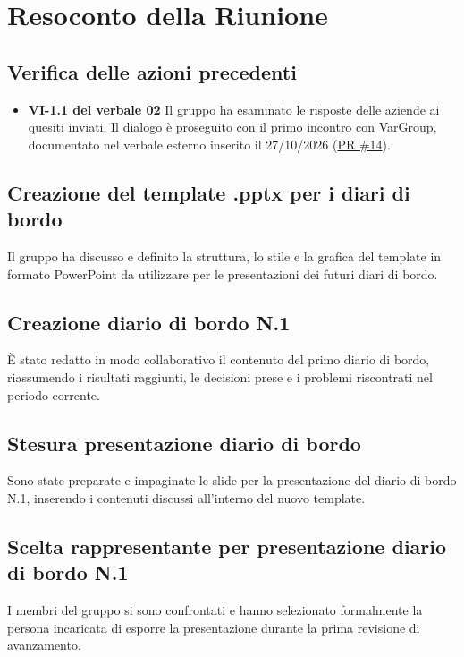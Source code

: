 \documentclass[a4paper, 11pt]{article}
\begin{document}
\newpage
\section{Resoconto della Riunione}

\subsection{Verifica delle azioni precedenti}
\begin{itemize}
    \item \textbf{VI-1.1 del verbale 02} Il gruppo ha esaminato le risposte delle aziende ai quesiti inviati. Il dialogo è proseguito con il primo incontro con VarGroup, documentato nel verbale esterno inserito il 27/10/2026 (\href{https://github.com/BitCrusher-Team/Progetto_SWE_26-27/pull/14}{PR \#14}).
\end{itemize}

\subsection{Creazione del template .pptx per i diari di bordo}
Il gruppo ha discusso e definito la struttura, lo stile e la grafica del template in formato PowerPoint da utilizzare per le presentazioni dei futuri diari di bordo.

\subsection{Creazione diario di bordo N.1}
È stato redatto in modo collaborativo il contenuto del primo diario di bordo, riassumendo i risultati raggiunti, le decisioni prese e i problemi riscontrati nel periodo corrente.

\subsection{Stesura presentazione diario di bordo}
Sono state preparate e impaginate le slide per la presentazione del diario di bordo N.1, inserendo i contenuti discussi all'interno del nuovo template.

\subsection{Scelta rappresentante per presentazione diario di bordo N.1}
I membri del gruppo si sono confrontati e hanno selezionato formalmente la persona incaricata di esporre la presentazione durante la prima revisione di avanzamento.
\end{document}
